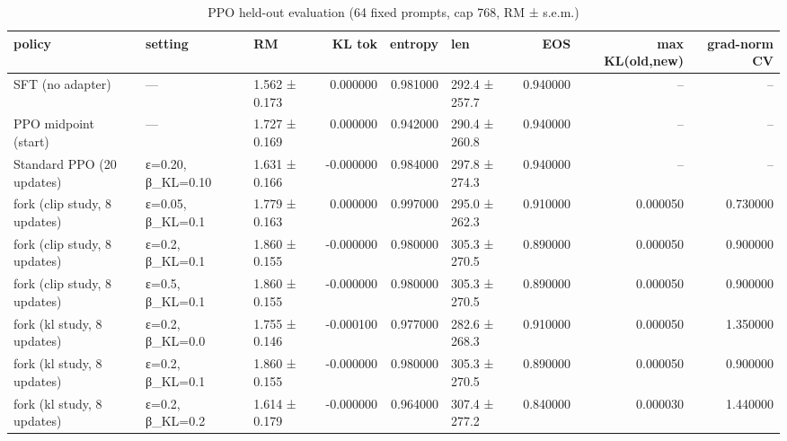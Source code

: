\begin{table}
\caption{PPO held-out evaluation (64 fixed prompts, cap 768, RM ± s.e.m.)}
\label{tab:t2_ppo_heldout}
\begin{tabular}{lllrrlrrr}
\toprule
policy & setting & RM & KL tok & entropy & len & EOS & max KL(old,new) & grad-norm CV \\
\midrule
SFT (no adapter) & — & 1.562 ± 0.173 & 0.000000 & 0.981000 & 292.4 ± 257.7 & 0.940000 & -- & -- \\
PPO midpoint (start) & — & 1.727 ± 0.169 & 0.000000 & 0.942000 & 290.4 ± 260.8 & 0.940000 & -- & -- \\
Standard PPO (20 updates) & ε=0.20, β\_KL=0.10 & 1.631 ± 0.166 & -0.000000 & 0.984000 & 297.8 ± 274.3 & 0.940000 & -- & -- \\
fork (clip study, 8 updates) & ε=0.05, β\_KL=0.1 & 1.779 ± 0.163 & 0.000000 & 0.997000 & 295.0 ± 262.3 & 0.910000 & 0.000050 & 0.730000 \\
fork (clip study, 8 updates) & ε=0.2, β\_KL=0.1 & 1.860 ± 0.155 & -0.000000 & 0.980000 & 305.3 ± 270.5 & 0.890000 & 0.000050 & 0.900000 \\
fork (clip study, 8 updates) & ε=0.5, β\_KL=0.1 & 1.860 ± 0.155 & -0.000000 & 0.980000 & 305.3 ± 270.5 & 0.890000 & 0.000050 & 0.900000 \\
fork (kl study, 8 updates) & ε=0.2, β\_KL=0.0 & 1.755 ± 0.146 & -0.000100 & 0.977000 & 282.6 ± 268.3 & 0.910000 & 0.000050 & 1.350000 \\
fork (kl study, 8 updates) & ε=0.2, β\_KL=0.1 & 1.860 ± 0.155 & -0.000000 & 0.980000 & 305.3 ± 270.5 & 0.890000 & 0.000050 & 0.900000 \\
fork (kl study, 8 updates) & ε=0.2, β\_KL=0.2 & 1.614 ± 0.179 & -0.000000 & 0.964000 & 307.4 ± 277.2 & 0.840000 & 0.000030 & 1.440000 \\
\bottomrule
\end{tabular}
\end{table}
